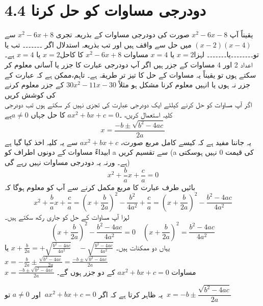 \section{ 4.4 دودرجی مساوات کو حل کرنا}
 یقیناً آپ  \(x^2-6x-8\) صورت کی دودرجی مساوات کے بذریعہ تجری \(x^2-6x+8\) سے  \((x-2)(x-4)\) میں حل سے واقف ہیں اور تب بذریعہ استدلال اگر ۔۔۔۔۔۔۔
 تب یا تو۔۔۔۔۔۔۔۔یا۔۔۔۔۔۔۔
 لہزا\( x=2\) یا \( x=4\)
 مساوات \(x^2-6x+8\) کا کاحل\( x=2\)  یا \( x=4\) ہے۔اعداد 2 اور 4 مساوات کے جزر ہیں
اگر آپ دودرجی عبارت کا جزر یا آسانی معلوم کر سکتے ہوں تو یقیناً یہ مساوات کے حل کا تیز تر طریقہ ہے۔
تاہم،ممکن ہے کہ عبارت کے جزر نہ ہوں یا انہیں معلوم کرنا مشکل ہو مثلاً  \(30x^{2}-11x-30\)  کے جزر معلوم کرنے کی کوشش کریں\\
 اگر آپ مساوات کو حل کرنے کیلئے ایک دودرجی عبارت کی تجزی نہیں کر سکتے ہوں تب دودرجی کلیہ استعمال کریں،
۔\(ax^{2}+bx+c=0\)  کا حل جہاں \(a\neq0\)ہے
\[x=\frac{-b\pm\sqrt{b^{2}-4ac}}{2a}\]
 یہ جاننا مفید ہے کہ کیسے کامل مربع صورت،  \(ax^{2}+bx+c\) سے یہ کلیہ اخذ کیا گیا ہے  ابیداءً مساوات کے دونوں اطراف کو a سے تقسیم کریں (a کی قیمت 0  نہیں ہوسکتی ہے۔ ورنہ یہ دودرجی مساوات نہیں رہے گی)
 \[x^{2}+\frac{b}{a}x+\frac{c}{a}=0\]
 \newpage
 بائیں طرف عبارت کا مربع مکمل کرنے سے آپ کو معلوم ہوگا کہ
\[x^{2}+\frac{b}{a}x+\frac{c}{a}=\left(x+\frac{b}{2a}\right)^{2}-\frac{b^{2}}{4a^{2}}+\frac{c}{a}=\left(x+\frac{b}{2a}\right)^{2}-\frac{b^{2}-4ac}{4a^{2}}\]
 لہزا آپ مساوات کے حل کو جاری رکھ سکتے ہیں۔
\[\left(x+\frac{b}{2a}\right)^{2}-\frac{b^{2}-4ac}{4a^{2}}=0\quad \left(x+\frac{b}{2a}\right)^{2}=\frac{b^{2}-4ac}{4a^{2}}\]
 یہاں دو ممکنات ہیں۔
 $x+\frac{b}{2a}=+\sqrt{\frac{b^{2}-4ac}{4a^{2}}}\quad-\sqrt{\frac{b^{2}-4ac}{4a^{2}}}$
 یا
$x=-\frac{b}{2a}\pm\frac{\sqrt{b^{2}-4ac}}{2a}=\frac{-b\pm\sqrt{b^{2}-4ac}}{2a}$
\\
$x=\frac{-b\pm\sqrt{b^{2}-4ac}}{2a}$
مساوات \(ax^2+bx+c=0\) کے دو جزر ہوں گے۔

یہ ظاہر کرتا ہے کہ اگر $ \ ax^{2} + bx+ c = 0 $ اور $a \neq 0 $ تو $\ x= -b \pm \dfrac{\sqrt{b^{2}-4ac}}{2a}$\\
